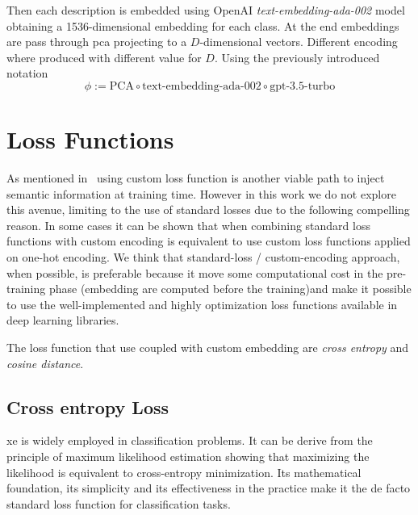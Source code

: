 \vspace{10pt}

Then each description is embedded using OpenAI \emph{text-embedding-ada-002}
model obtaining a 1536-dimensional embedding for each class. At the end
embeddings are pass through \acrshort{pca} projecting to a $D$-dimensional
vectors. Different encoding where produced with different value for $D$. Using
the previously introduced notation
\begin{equation}
  \phi := \textrm{PCA} \circ \textrm{text-embedding-ada-002} \circ
  \textrm{gpt-3.5-turbo}
  \label{eq:desc-pca}
\end{equation}



\section{Loss Functions}
\label{sec:losses}

As mentioned in~ using custom loss function is another
viable path to inject semantic information at training time. However in this
work we do not explore this avenue, limiting to the use of standard losses due
to the following compelling reason. In some cases it can be shown that when
combining standard loss functions with custom encoding is equivalent to use
custom loss functions applied on one-hot encoding. We think that standard-loss /
custom-encoding approach, when possible, is preferable because it move some
computational cost in the pre-training phase (embedding are computed before the
training)and make it possible to use the well-implemented and highly
optimization loss functions available in deep learning libraries.

The loss function that use coupled with custom embedding are \emph{cross
entropy} and \emph{cosine distance}.

\subsection{Cross entropy Loss}
\label{subsec:cross-entropy-loss}

\acrfull{xe} is widely employed in classification problems. It can be derive
from the principle of maximum likelihood estimation showing that maximizing the
likelihood is equivalent to cross-entropy minimization. Its mathematical
foundation, its simplicity and its effectiveness in the practice make it the de
facto standard loss function for classification tasks.

